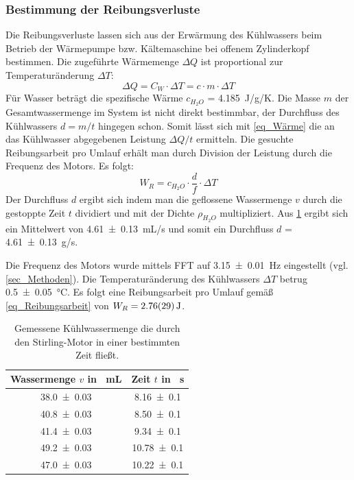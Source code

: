 \documentclass[
	a4paper,
	12pt,
	pagesize,
	ngerman
]{scrartcl}
\begin{document}
	\subsubsection{Bestimmung der Reibungsverluste}
	Die Reibungsverluste lassen sich aus der Erwärmung des Kühlwassers beim Betrieb der Wärmepumpe bzw. Kältemaschine bei offenem Zylinderkopf bestimmen.
	Die zugeführte Wärmemenge $\Delta{Q}$ ist proportional zur Temperaturänderung $\Delta{T}$:
	\begin{equation}
	\Delta{Q} = C_W \cdot \Delta{T} = c \cdot m \cdot \Delta{T}
	\label{eq_Wärme}
	\end{equation} 
	Für Wasser beträgt die spezifische Wärme $c_{H_2O}$ = \SI{4,185}{J/g/K}. %
	Die Masse $m$ der Gesamtwassermenge im System ist nicht direkt bestimmbar, der Durchfluss des Kühlwassers $d=m/t$ hingegen schon.
	Somit lässt sich mit \cref{eq_Wärme} die an das Kühlwasser abgegebenen Leistung $\Delta{Q}/t$ ermitteln.
	Die gesuchte Reibungsarbeit pro Umlauf erhält man durch Division der Leistung durch die Frequenz des Motors.
	Es folgt:
	\begin{equation}
	W_R = c_{H_2O} \cdot \frac{d}{f} \cdot \Delta{T} %
	\label{eq_Reibungsarbeit}
	\end{equation}
	Der Durchfluss $d$ ergibt sich indem man die geflossene Wassermenge $v$ durch die gestoppte Zeit $t$ dividiert und mit der Dichte $\rho_{H_2O}$ multipliziert. Aus \cref{tab_Durchfluss} ergibt sich ein Mittelwert von \SI{4,61+-0,13}{mL/s} und somit ein Durchfluss $d$ = \SI{4,61+-0,13}{g/s}.
	
	Die Frequenz des Motors wurde mittels FFT auf \SI{3,15+-0,01}{Hz} eingestellt (vgl. \cref{sec_Methoden}).
	Die Temperaturänderung des Kühlwassers $\Delta{T}$ betrug \SI{0,5+-0,05}{\degreeCelsius}.
	Es folgt eine Reibungsarbeit pro Umlauf gemäß \cref{eq_Reibungsarbeit} von $W_R=\SI{2,76+-0,29}{J}$.
	\begin{table}[H]
		\centering
		\begin{tabular}{ c | c }
			Wassermenge $v$ in \SI{}{mL} & Zeit $t$ in \SI{}{s} \\ \hline
			\SI{38,0+-0,03}{}&\SI{8,16+-0,1}{}\\
			\SI{40,8+-0,03}{}&\SI{8,50+-0,1}{}\\
			\SI{41,4+-0,03}{}&\SI{9,34+-0,1}{}\\
			\SI{49,2+-0,03}{}&\SI{10,78+-0,1}{}\\
			\SI{47,0+-0,03}{}&\SI{10,22+-0,1}{}\\
		\end{tabular}
		\caption{Gemessene Kühlwassermenge die durch den Stirling-Motor in einer bestimmten Zeit fließt.}
		\label{tab_Durchfluss} 
	\end{table}
	
\end{document}
